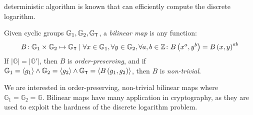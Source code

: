 deterministic algorithm is known that can efficiently compute the discrete logarithm.
\begin{definition}
	Given cyclic groups \(\mathbb{G}_1, \mathbb{G}_2, \mathbb{G}_{\transpose}\), a
	\emph{bilinear map} is any function:
	\[
		B\colon \mathbb{G}_1 \times \mathbb{G}_2 \mapsto \mathbb{G}_{\transpose} \mid
		\forall x \in \mathbb{G}_1, \forall y \in \mathbb{G}_2, \forall a,b \in \mathbb{Z}\colon
		B\left(x^a, y^b\right) = {B\left(x, y\right)}^{ab}
	\]
	If \(\left|\mathbb{G}\right| = \left|\mathbb{G}'\right|\), then \(B\) is \emph{order-preserving},
	and if \(\mathbb{G}_1 = \left\langle{g_1}\right\rangle \land \mathbb{G}_2 =
	\left\langle{g_2}\right\rangle \land
	\mathbb{G}_{\transpose} = \left\langle{B\left(g_1, g_2\right)}\right\rangle \), then \(B\) is
	\emph{non-trivial}.
\end{definition}

\noindent We are interested in order-preserving, non-trivial bilinear maps where
\(\mathbb{G}_1 = \mathbb{G}_2 = \mathbb{G}\).
Bilinear maps have many application in cryptography, as they are used to exploit the hardness of
the discrete logarithm problem.
